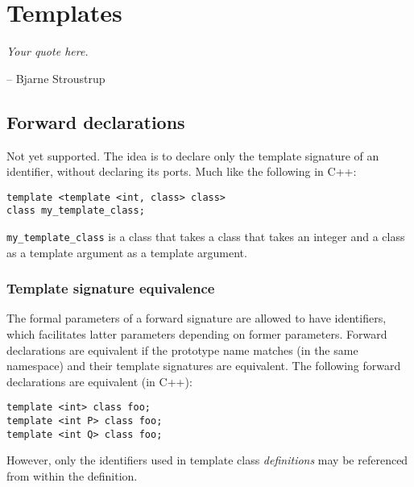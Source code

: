 

\chapter{Templates}
\label{sec:templates}

\begin{flushright}
{\itshape Your quote here.

\bigskip
-- Bjarne Stroustrup
}
\end{flushright}

\section{Forward declarations}
\label{sec:templates:forward}

Not yet supported.  
The idea is to declare only the template signature of an identifier, 
without declaring its ports.  
Much like the following in C++:

\begin{verbatim}
template <template <int, class> class>
class my_template_class;
\end{verbatim}

\noindent
\verb|my_template_class| is a class that takes a 
class that takes an integer and a class as a template argument 
as a template argument.  

\subsection{Template signature equivalence}
\label{sec:templates:forward:equiv}

The formal parameters of a forward signature are allowed to have identifiers, 
which facilitates latter parameters depending on former parameters.  
Forward declarations are equivalent if the prototype name matches (in the
same namespace) and their template signatures are equivalent.  
The following forward declarations are equivalent (in C++):

\begin{verbatim}
template <int> class foo;
template <int P> class foo;
template <int Q> class foo;
\end{verbatim}

However, only the identifiers used in template class \emph{definitions}
may be referenced from within the definition.  

